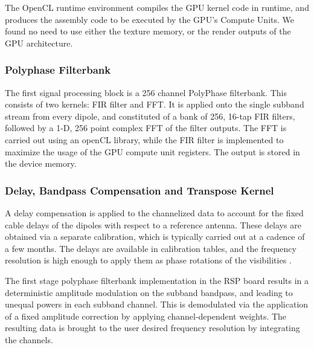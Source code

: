 \documentclass{ws-jai}
\begin{document}
The OpenCL  runtime environment  compiles the  GPU kernel  code in  runtime, and
produces the assembly code  to be executed by the GPU's  Compute Units. We found
no need  to use  either the  texture memory, or  the render  outputs of  the GPU
architecture.\\


\subsubsection {Polyphase Filterbank}
 The first signal processing block is a
256 channel PolyPhase  filterbank. This consists of two kernels:  FIR filter and
FFT.   It is  applied onto  the  single subband  stream from  every dipole,  and
constituted of a bank  of 256, 16-tap FIR filters, followed by  a 1-D, 256 point
complex FFT  of the  filter outputs.   The FFT  is carried  out using  an openCL
library, while the  FIR filter is implemented  to maximize the usage  of the GPU
compute unit registers. The output is stored in the device memory.\\

\subsubsection {Delay,  Bandpass Compensation and Transpose  Kernel}
 A delay
compensation is applied  to the channelized data to account  for the fixed cable
delays of  the dipoles with  respect to a  reference antenna.  These  delays are
obtained via a separate calibration, which is typically carried out at a cadence
of  a few  months.  The  delays  are available  in calibration  tables, and  the
frequency resolution  is high  enough to  apply them as  phase rotations  of the
visibilities \cite {zatman1998narrow}.

The first stage polyphase filterbank implementation  in the RSP board results in
a deterministic  amplitude modulation  on the subband  bandpass, and  leading to
unequal powers in each subband channel.  This is demodulated via the application
of  a fixed  amplitude correction  by applying  channel-dependent weights.   The
resulting  data  is  brought  to   the  user  desired  frequency  resolution  by
integrating the channels.
\end{document}
